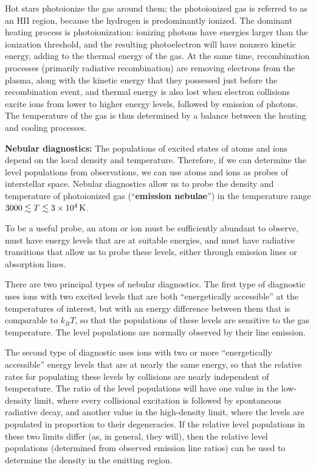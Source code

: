\documentclass[a4paper,10pt]{article}
\begin{document}
Hot stars photoionize the gas around them; the photoionized gas is referred to as an HII region, because the hydrogen is predominantly ionized. The dominant heating process is photoionization: ionizing photons have energies larger than the ionization threshold, and the resulting photoelectron will have nonzero kinetic energy, adding to the thermal energy of the gas. At the same time, recombination processes (primarily radiative recombination) are removing electrons from the plasma, along with the kinetic energy that they possessed just before the recombination event, and thermal energy is also lost when electron collisions excite ions from lower to higher energy levels, followed by emission of photons. The temperature of the gas is thus determined by a balance between the heating and cooling processes.

{\noindent}\textbf{Nebular diagnostics:} The populations of excited states of atoms and ions depend on the local density and temperature. Therefore, if we can determine the level populations from observations, we can use atoms and ions as probes of interstellar space. Nebular diagnostics allow us to probe the density and temperature of photoionized gas (``\textbf{emission nebulae}'') in the temperature range $3000\lesssim T\lesssim3\times10^4\,{\rm K}$.

{\noindent}To be a useful probe, an atom or ion must be sufficiently abundant to observe, must have energy levels that are at suitable energies, and must have radiative transitions that allow us to probe these levels, either through emission lines or absorption lines.

{\noindent}There are two principal types of nebular diagnostics. The first type of diagnostic uses ions with two excited levels that are both ``energetically accessible'' at the temperatures of interest, but with an energy difference between them that is comparable to $k_BT$, so that the populations of these levels are sensitive to the gas temperature. The level populations are normally observed by their line emission.

{\noindent}The second type of diagnostic uses ions with two or more ``energetically accessible'' energy levels that are at nearly the same energy, so that the relative rates for populating these levels by collisions are nearly independent of temperature. The ratio of the level populations will have one value in the low-density limit, where every collisional excitation is followed by spontaneous radiative decay, and another value in the high-density limit, where the levels are populated in proportion to their degeneracies. If the relative level populations in these two limits differ (as, in general, they will), then the relative level populations (determined from observed emission line ratios) can be used to determine the density in the emitting region.
\end{document}
